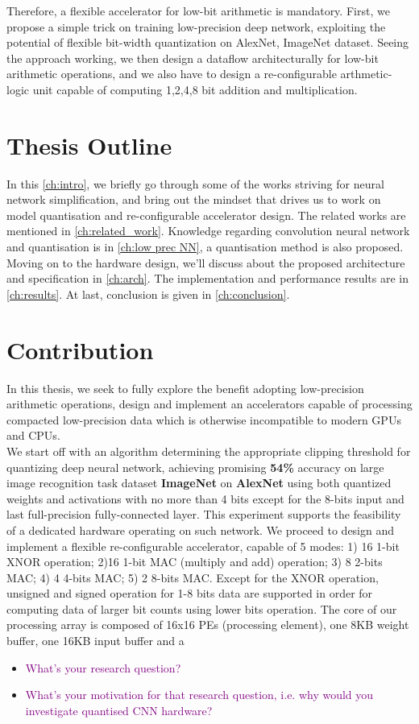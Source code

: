 Therefore, a flexible accelerator for low-bit arithmetic is mandatory. First, we propose a simple trick on training low-precision deep network, exploiting the potential of flexible bit-width quantization on AlexNet, ImageNet dataset. Seeing the approach working, we then design a dataflow architecturally for low-bit arithmetic operations, and we also have to design a re-configurable arthmetic-logic unit capable of computing 1,2,4,8 bit addition and multiplication. 
\section{Thesis Outline}
In this \autoref{ch:intro}, we briefly go through some of the works striving for neural network simplification, and bring out the mindset that drives us to work on model quantisation and re-configurable accelerator design. The related works are mentioned in \autoref{ch:related_work}. Knowledge regarding convolution neural network and quantisation is in \autoref{ch:low prec NN}, a quantisation method is also proposed. Moving on to the hardware design, we'll discuss about the proposed architecture and specification in \autoref{ch:arch}. The implementation and performance results are in \autoref{ch:results}. At last, conclusion is given in \autoref{ch:conclusion}.  
\section{Contribution}
In this thesis, we seek to fully explore the benefit adopting low-precision arithmetic operations, design and implement an accelerators capable of processing compacted low-precision data which is otherwise incompatible to modern GPUs and CPUs. \\
We start off with an algorithm determining the appropriate clipping threshold for quantizing deep neural network, achieving promising \textbf{54\%} accuracy on large image recognition task dataset \textbf{ImageNet} on \textbf{AlexNet} using both quantized weights and activations with no more than 4 bits except for the 8-bits input and last full-precision fully-connected layer. This experiment supports the feasibility of a dedicated hardware operating on such network. We proceed to design and implement a flexible re-configurable accelerator, capable of 5 modes: 1) 16 1-bit XNOR operation; 2)16 1-bit MAC (multiply and add) operation; 3) 8 2-bits MAC; 4) 4 4-bits MAC; 5) 2 8-bits MAC. Except for the XNOR operation, unsigned and signed operation for 1-8 bits data are supported in order for computing data of larger bit counts using lower bits operation. The core of our processing array is composed of 16x16 PEs (processing element), one 8KB weight buffer, one 16KB input buffer and a \TODO{}


\begin{itemize}
    \item \textcolor{purple}{What's your research question?}
    \item \textcolor{purple}{What's your motivation for that research question, i.e. why would you investigate quantised CNN hardware?}
\end{itemize}
